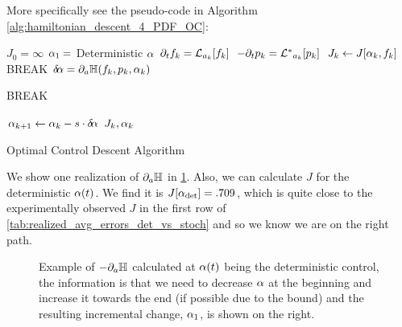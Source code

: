 \documentclass{article}
\begin{document}
More specifically see the pseudo-code in
Algorithm \ref{alg:hamiltonian_descent_4_PDF_OC}:
\begin{algorithm}
\begin{algorithmic}
\State $J_0 = \infty $ 
\State ${\alpha}_1 = $ Deterministic ${\alpha}$
	\State ${\partial}_t f_{k} = { \mathcal{L} }_{a_{k}} [ f_{k}]$
	\State $-{\partial}_t p_{k} = { { \mathcal{L} }^* }_{a_{k}} [ p_{k}]$
	\State $J_{k} \gets J[{\alpha}_k, f_k]$
		\State BREAK
	\EndIf
	\State ${ \delta\! {\alpha}} = {\partial}_a { \mathbb{H}}(f_{k} ,p_{k},  {\alpha}_{k})$

		\State BREAK
	\EndIf

	\State ${\alpha}_{k+1} \gets {\alpha}_{k} - s \cdot { \delta\! {\alpha}}  $
\EndFor
\State \Return $J_k, {\alpha}_k$
\end{algorithmic}
\caption{Optimal Control Descent Algorithm}
\label{alg:hamiltonian_descent_4_PDF_OC}
\end{algorithm}


We show one realization of ${\partial}_a { \mathbb{H}}$ in \cref{fig:grad_aH_deterministic_alpha}.
Also, we can calculate $J$ for the deterministic ${\alpha}(t)$. We find it is
$J[{\alpha}_{\text{det}}] = .709$, which is quite close to the experimentally observed
$J$ in the first row of \cref{tab:realized_avg_errors_det_vs_stoch} and so we
know we are on the right path.
\begin{figure}[htp]
\begin{center}
  \caption[labelInTOC]{Example of $-{\partial}_a { \mathbb{H}}$ calculated at ${\alpha}(t)$ being the
  deterministic control, the information is that we need to decrease ${\alpha}$ at the beginning and increase it
  towards the end (if possible due to the bound) and the resulting incremental
  change, ${\alpha}_1$, is shown on the right. }
  \label{fig:grad_aH_deterministic_alpha}
\end{center}
\end{figure} 
\end{document}
